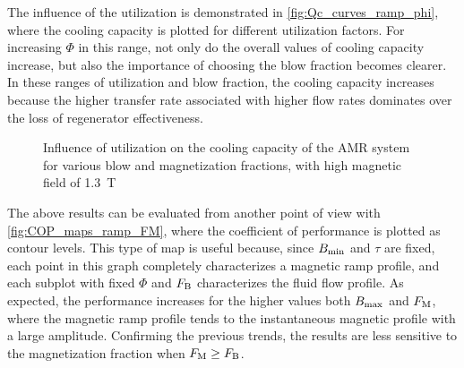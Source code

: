 \documentclass[referee]{svjour3}
\newcommand{\bmax}{\ensuremath{{B}\ped{max}}}
\newcommand{\bmin}{\ensuremath{{B}\ped{min}}}
\begin{document}
The influence of the utilization is demonstrated in \autoref{fig:Qc_curves_ramp_phi}, where the cooling capacity is plotted for different utilization factors. For increasing $\Phi$ in this range, not only do the overall values of cooling capacity increase, but also the importance of choosing the blow fraction becomes clearer. In these ranges of utilization and blow fraction,  the cooling capacity increases because the higher transfer rate associated with higher flow rates dominates over the loss of regenerator effectiveness.

\begin{figure}[!ht]
  \centering
\quad
  \caption{Influence of utilization on the cooling capacity of the AMR system for  various blow and magnetization fractions, with high magnetic field of \SI{1.3}{\tesla}}
  \label{fig:Qc_curves_ramp_phi}
\end{figure}

The above results can be evaluated from another point of view with \autoref{fig:COP_maps_ramp_FM}, where the coefficient of performance is plotted as contour levels. This type of map is useful because, since $\bmin$ and $\tau$ are fixed, each point in this graph completely characterizes a magnetic ramp profile, and each subplot with fixed $\Phi$ and $F_{\mathrm{B}}$ characterizes the fluid flow profile. As expected, the performance increases for the higher values both $\bmax$ and $F_{\mathrm{M}}$, where the  magnetic ramp profile tends to the instantaneous magnetic profile with a large amplitude. Confirming the previous trends, the results are less sensitive to the magnetization fraction when $F_{\mathrm{M}} \ge F_{\mathrm{B}}$. 
\end{document}
